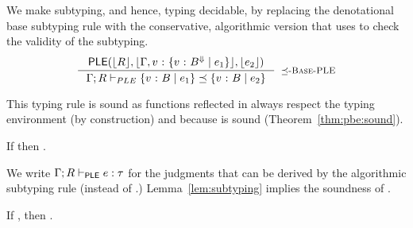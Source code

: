 %
We make subtyping, and hence, typing decidable,
by replacing the denotational base subtyping
rule \rsubbasecore with the conservative,
algorithmic version \rsubbasepbe that uses
\pbesym to check the validity of the
subtyping.
%
$$
\inference{
\pbe{\tosmt{\RRenv}}{\tosmt{\env,\tbind{v}{\tref{v}{\btyp^\tlabel}{\refa_1}}}}{\tosmt{\refa_2}}
}{
	\pbeissubtype{\env}{\RRenv}{\tref{v}{\btyp}{\refa_1}}{\tref{v}{\btyp}{\refa_2}}
}[\rsubbasepbe]
$$

This typing rule is sound as functions reflected in \RRenv
always respect the typing environment \env (by construction)
and because \pbename is sound (Theorem~\ref{thm:pbe:sound}).
%
\begin{lemma}\label{lem:subtyping} %
If {}
then {}.
\end{lemma}

%
We write $\Gamma; R \vdash_{\mathsf{PLE}} e : \tau$
for the judgments that can be derived by the
algorithmic subtyping rule \rsubbasepbe (instead of \rsubbasecore.)
%
Lemma~\ref{lem:subtyping} implies the soundness of \smtlan.
%
\begin{theorem}\label{thm:soundness-smt}
If , then .
\end{theorem}
